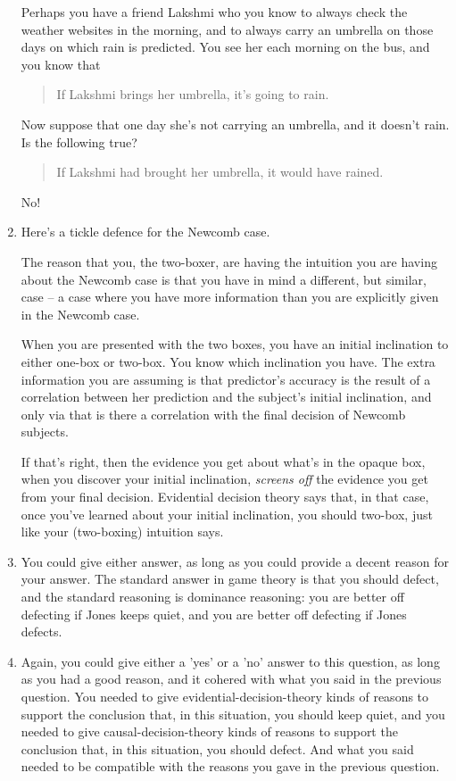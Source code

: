 \documentclass[12pt,a4paper]{article}
\begin{document}
\begin{enumerate}
Perhaps you have a friend Lakshmi who you know to always check the weather websites in the morning, and to always carry an umbrella on those days on which rain is predicted. You see her each morning on the bus, and you know that

\begin{quote}
If Lakshmi brings her umbrella, it's going to rain.
\end{quote}

Now suppose that one day she's not carrying an umbrella, and it doesn't rain. Is the following true?

\begin{quote}
If Lakshmi had brought her umbrella, it would have rained.
\end{quote}

No! 

\item Here's a tickle defence for the Newcomb case. 

The reason that you, the two-boxer, are having the intuition you are having about the Newcomb case is that you have in mind a different, but similar, case -- a case where you have more information than you are explicitly given in the Newcomb case. 

When you are presented with the two boxes, you have an initial inclination to either one-box or two-box. You know which inclination you have. The extra information you are assuming is that predictor's accuracy is the result of a correlation between her prediction and the subject's initial inclination, and only via that is there a correlation with the final decision of Newcomb subjects.

If that's right, then the evidence you get about what's in the opaque box, when you discover your initial inclination, \emph{screens off} the evidence you get from your final decision. Evidential decision theory says that, in that case, once you've learned about your initial inclination, you should two-box, just like your (two-boxing) intuition says.

\item You could give either answer, as long as you could provide a decent reason for your answer. The standard answer in game theory is that you should defect, and the standard reasoning is dominance reasoning: you are better off defecting if Jones keeps quiet, and you are better off defecting if Jones defects.

\item Again, you could give either a 'yes' or a 'no' answer to this question, as long as you had a good reason, and it cohered with what you said in the previous question. You needed to give evidential-decision-theory kinds of reasons to support the conclusion that, in this situation, you should keep quiet, and you needed to give causal-decision-theory kinds of reasons to support the conclusion that, in this situation, you should defect. And what you said needed to be compatible with the reasons you gave in the previous question.

\end{enumerate}
\end{document}
